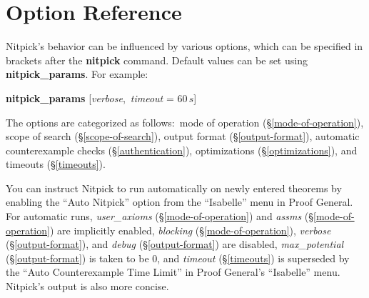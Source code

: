 \documentclass[a4paper,12pt]{article}
\begin{document}
\section{Option Reference}
\label{option-reference}

\def\flushitem#1{\item[]\noindent\kern-\leftmargin \textbf{#1}}
\def\qty#1{$\left<\textit{#1}\right>$}
\def\qtybf#1{$\mathbf{\left<\textbf{\textit{#1}}\right>}$}
\def\optrue#1#2{\flushitem{\textit{#1} $\bigl[$= \qtybf{bool}$\bigr]$\quad [\textit{true}]\hfill (neg.: \textit{#2})}\nopagebreak\\[\parskip]}
\def\opfalse#1#2{\flushitem{\textit{#1} $\bigl[$= \qtybf{bool}$\bigr]$\quad [\textit{false}]\hfill (neg.: \textit{#2})}\nopagebreak\\[\parskip]}
\def\opsmart#1#2{\flushitem{\textit{#1} $\bigl[$= \qtybf{bool\_or\_smart}$\bigr]$\quad [\textit{smart}]\hfill (neg.: \textit{#2})}\nopagebreak\\[\parskip]}
\def\ops#1#2{\flushitem{\textit{#1} = \qtybf{#2}} \nopagebreak\\[\parskip]}
\def\opt#1#2#3{\flushitem{\textit{#1} = \qtybf{#2}\quad [\textit{#3}]} \nopagebreak\\[\parskip]}
\def\opu#1#2#3{\flushitem{\textit{#1} \qtybf{#2} = \qtybf{#3}} \nopagebreak\\[\parskip]}
\def\opusmart#1#2#3{\flushitem{\textit{#1} \qtybf{#2} $\bigl[$= \qtybf{bool\_or\_smart}$\bigr]$\hfill (neg.: \textit{#3})}\nopagebreak\\[\parskip]}

Nitpick's behavior can be influenced by various options, which can be specified
in brackets after the \textbf{nitpick} command. Default values can be set
using \textbf{nitpick\_\allowbreak params}. For example:

\prew
\textbf{nitpick\_params} [\textit{verbose}, \,\textit{timeout} = 60$\,s$]
\postw

The options are categorized as follows:\ mode of operation
(\S\ref{mode-of-operation}), scope of search (\S\ref{scope-of-search}), output
format (\S\ref{output-format}), automatic counterexample checks
(\S\ref{authentication}), optimizations
(\S\ref{optimizations}), and timeouts (\S\ref{timeouts}).

You can instruct Nitpick to run automatically on newly entered theorems by
enabling the ``Auto Nitpick'' option from the ``Isabelle'' menu in Proof
General. For automatic runs, \textit{user\_axioms} (\S\ref{mode-of-operation})
and \textit{assms} (\S\ref{mode-of-operation}) are implicitly enabled,
\textit{blocking} (\S\ref{mode-of-operation}), \textit{verbose}
(\S\ref{output-format}), and \textit{debug} (\S\ref{output-format}) are
disabled, \textit{max\_potential} (\S\ref{output-format}) is taken to be 0, and
\textit{timeout} (\S\ref{timeouts}) is superseded by the ``Auto Counterexample
Time Limit'' in Proof General's ``Isabelle'' menu. Nitpick's output is also more
concise.
\end{document}
